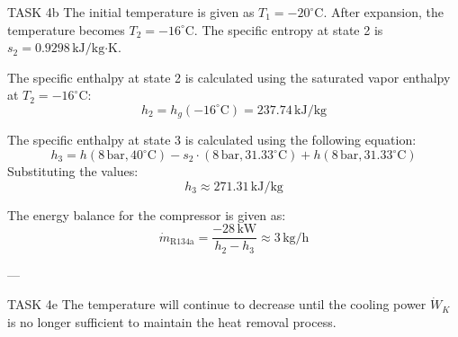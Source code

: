 TASK 4b  
The initial temperature is given as \( T_1 = -20^\circ\text{C} \). After expansion, the temperature becomes \( T_2 = -16^\circ\text{C} \). The specific entropy at state 2 is \( s_2 = 0.9298 \, \text{kJ/kg·K} \).  

The specific enthalpy at state 2 is calculated using the saturated vapor enthalpy at \( T_2 = -16^\circ\text{C} \):  
\[
h_2 = h_g(-16^\circ\text{C}) = 237.74 \, \text{kJ/kg}
\]  

The specific enthalpy at state 3 is calculated using the following equation:  
\[
h_3 = h(8 \, \text{bar}, 40^\circ\text{C}) - s_2 \cdot (8 \, \text{bar}, 31.33^\circ\text{C}) + h(8 \, \text{bar}, 31.33^\circ\text{C})
\]  
Substituting the values:  
\[
h_3 \approx 271.31 \, \text{kJ/kg}
\]  

The energy balance for the compressor is given as:  
\[
\dot{m}_{\text{R134a}} = \frac{-28 \, \text{kW}}{h_2 - h_3} \approx 3 \, \text{kg/h}
\]  

---

TASK 4e  
The temperature will continue to decrease until the cooling power \( \dot{W}_K \) is no longer sufficient to maintain the heat removal process.